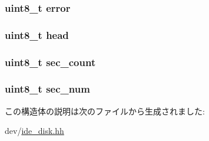 \label{structCommandReg_a3f7026e41497f11cac6febb94464474c}
\hypertarget{structCommandReg_adc64ccb7538429fe78e3fe0139267370}{
\subsubsection[{error}]{\setlength{\rightskip}{0pt plus 5cm}uint8\_\-t {\bf error}}}
\label{structCommandReg_adc64ccb7538429fe78e3fe0139267370}
\hypertarget{structCommandReg_a9794c0e61506b826b49b458708ae2489}{
\subsubsection[{head}]{\setlength{\rightskip}{0pt plus 5cm}uint8\_\-t {\bf head}}}
\label{structCommandReg_a9794c0e61506b826b49b458708ae2489}
\hypertarget{structCommandReg_a2b7ca3bc768d3d472ebf8dcc6d7b5588}{
\subsubsection[{sec\_\-count}]{\setlength{\rightskip}{0pt plus 5cm}uint8\_\-t {\bf sec\_\-count}}}
\label{structCommandReg_a2b7ca3bc768d3d472ebf8dcc6d7b5588}
\hypertarget{structCommandReg_a3940c6ebbd3db04528668419e3569c78}{
\subsubsection[{sec\_\-num}]{\setlength{\rightskip}{0pt plus 5cm}uint8\_\-t {\bf sec\_\-num}}}
\label{structCommandReg_a3940c6ebbd3db04528668419e3569c78}


この構造体の説明は次のファイルから生成されました:\begin{DoxyCompactItemize}
\item 
dev/\hyperlink{ide__disk_8hh}{ide\_\-disk.hh}\end{DoxyCompactItemize}
